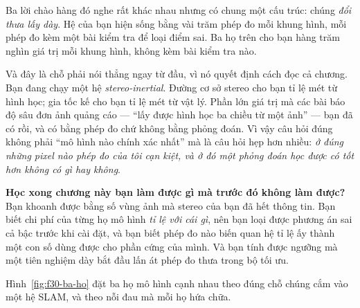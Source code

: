 \documentclass[../../deep_learning.tex]{subfiles}
\begin{document}
Ba lời chào hàng đó nghe rất khác nhau nhưng có chung một cấu trúc: chúng \emph{đổi thưa lấy dày}. Hệ của bạn hiện sống bằng vài trăm phép đo mỗi khung hình, mỗi phép đo kèm một bài kiểm tra để loại điểm sai. Ba họ trên cho bạn hàng trăm nghìn giá trị mỗi khung hình, không kèm bài kiểm tra nào.

Và đây là chỗ phải nói thẳng ngay từ đầu, vì nó quyết định cách đọc cả chương. Bạn đang chạy một hệ \emph{stereo-inertial}. Đường cơ sở stereo cho bạn tỉ lệ mét từ hình học; gia tốc kế cho bạn tỉ lệ mét từ vật lý. Phần lớn giá trị mà các bài báo độ sâu đơn ảnh quảng cáo --- ``lấy được hình học ba chiều từ một ảnh'' --- bạn đã có rồi, và có bằng phép đo chứ không bằng phỏng đoán. Vì vậy câu hỏi đúng không phải ``mô hình nào chính xác nhất'' mà là câu hỏi hẹp hơn nhiều: \emph{ở đúng những pixel nào phép đo của tôi cạn kiệt, và ở đó một phỏng đoán học được có tốt hơn không có gì hay không}.

\textbf{Học xong chương này bạn làm được gì mà trước đó không làm được?} Bạn khoanh được bằng số vùng ảnh mà stereo của bạn đã hết thông tin. Bạn biết chi phí của từng họ mô hình \emph{tỉ lệ với cái gì}, nên bạn loại được phương án sai cả bậc trước khi cài đặt, và bạn biết phép đo nào biến quan hệ tỉ lệ ấy thành một con số dùng được cho phần cứng của mình. Và bạn tính được ngưỡng mà một tiên nghiệm dày bắt đầu lấn át phép đo thưa trong bộ tối ưu.

Hình~\ref{fig:f30-ba-ho} đặt ba họ mô hình cạnh nhau theo đúng chỗ chúng cắm vào một hệ SLAM, và theo nỗi đau mà mỗi họ hứa chữa.
\end{document}
